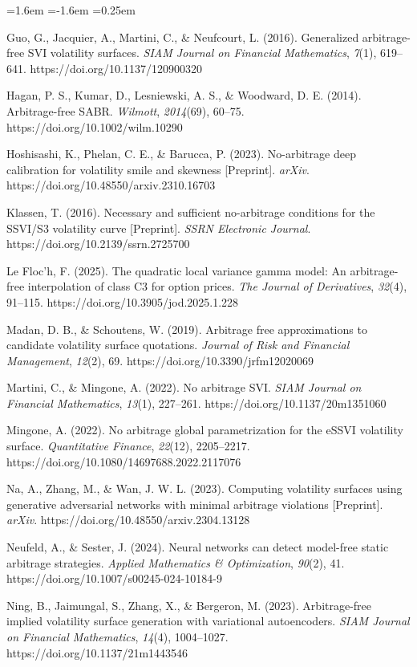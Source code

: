 \documentclass[11pt]{article}
\begin{document}
\begin{list}{}{\leftmargin=1.6em \itemindent=-1.6em \itemsep=0.25em}
\item Guo, G., Jacquier, A., Martini, C., \& Neufcourt, L. (2016). Generalized arbitrage-free SVI volatility surfaces. \textit{SIAM Journal on Financial Mathematics}, \textit{7}(1), 619–641. https://doi.org/10.1137/120900320
\item Hagan, P. S., Kumar, D., Lesniewski, A. S., \& Woodward, D. E. (2014). Arbitrage-free SABR. \textit{Wilmott}, \textit{2014}(69), 60–75. https://doi.org/10.1002/wilm.10290
\item Hoshisashi, K., Phelan, C. E., \& Barucca, P. (2023). No-arbitrage deep calibration for volatility smile and skewness [Preprint]. \textit{arXiv}. https://doi.org/10.48550/arxiv.2310.16703
\item Klassen, T. (2016). Necessary and sufficient no-arbitrage conditions for the SSVI/S3 volatility curve [Preprint]. \textit{SSRN Electronic Journal}. https://doi.org/10.2139/ssrn.2725700
\item Le Floc’h, F. (2025). The quadratic local variance gamma model: An arbitrage-free interpolation of class C3 for option prices. \textit{The Journal of Derivatives}, \textit{32}(4), 91–115. https://doi.org/10.3905/jod.2025.1.228
\item Madan, D. B., \& Schoutens, W. (2019). Arbitrage free approximations to candidate volatility surface quotations. \textit{Journal of Risk and Financial Management}, \textit{12}(2), 69. https://doi.org/10.3390/jrfm12020069
\item Martini, C., \& Mingone, A. (2022). No arbitrage SVI. \textit{SIAM Journal on Financial Mathematics}, \textit{13}(1), 227–261. https://doi.org/10.1137/20m1351060
\item Mingone, A. (2022). No arbitrage global parametrization for the eSSVI volatility surface. \textit{Quantitative Finance}, \textit{22}(12), 2205–2217. https://doi.org/10.1080/14697688.2022.2117076
\item Na, A., Zhang, M., \& Wan, J. W. L. (2023). Computing volatility surfaces using generative adversarial networks with minimal arbitrage violations [Preprint]. \textit{arXiv}. https://doi.org/10.48550/arxiv.2304.13128
\item Neufeld, A., \& Sester, J. (2024). Neural networks can detect model-free static arbitrage strategies. \textit{Applied Mathematics \& Optimization}, \textit{90}(2), 41. https://doi.org/10.1007/s00245-024-10184-9
\item Ning, B., Jaimungal, S., Zhang, X., \& Bergeron, M. (2023). Arbitrage-free implied volatility surface generation with variational autoencoders. \textit{SIAM Journal on Financial Mathematics}, \textit{14}(4), 1004–1027. https://doi.org/10.1137/21m1443546

\end{list}
\end{document}
